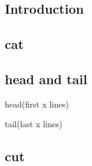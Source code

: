 
\subsection{Introduction}
 

\subsection{cat}

\subsection{head and tail}
head(first x lines)

tail(last x lines)

\subsection{cut}
